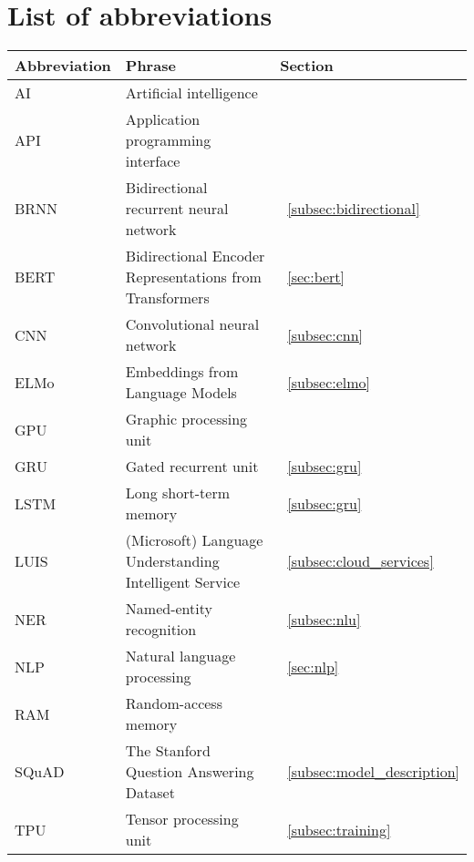 \chapter*{List of abbreviations}
\label{ch:abbrevations}

\begin{tabular}{l l l}
    \textbf{Abbreviation} & \textbf{Phrase} & \textbf{Section} \\
    \hline
    AI & Artificial intelligence \\
    API & Application programming interface\\
    BRNN & Bidirectional recurrent neural network &~\ref{subsec:bidirectional}\\
    BERT & Bidirectional Encoder Representations from Transformers &~\ref{sec:bert}\\
    CNN & Convolutional neural network &~\ref{subsec:cnn}\\
    ELMo & Embeddings from Language Models &~\ref{subsec:elmo}\\
    GPU & Graphic processing unit \\
    GRU & Gated recurrent unit &~\ref{subsec:gru}\\
    LSTM & Long short-term memory &~\ref{subsec:gru}\\
    LUIS & (Microsoft) Language Understanding Intelligent Service &~\ref{subsec:cloud_services}\\
    NER & Named-entity recognition &~\ref{subsec:nlu}\\
    NLP & Natural language processing &~\ref{sec:nlp}\\
    RAM & Random-access memory \\
    SQuAD & The Stanford Question Answering Dataset &~\ref{subsec:model_description}\\
    TPU & Tensor processing unit &~\ref{subsec:training}\\
\end{tabular}
